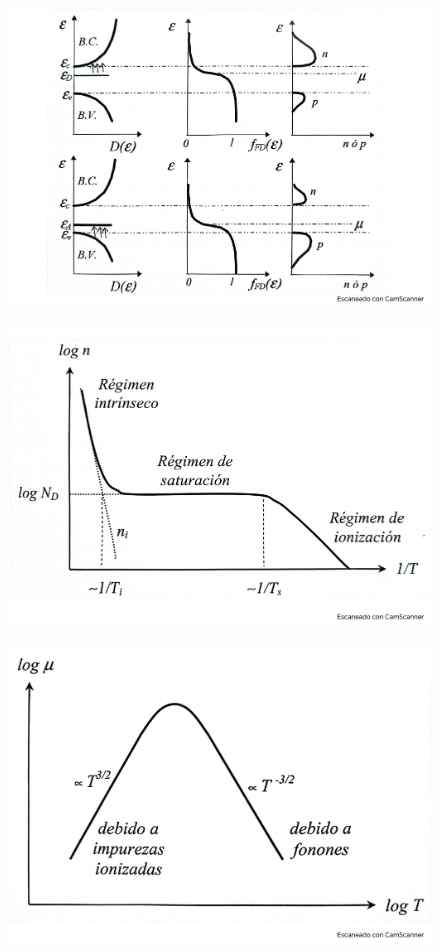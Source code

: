 \begin{figure}[h!] \centering
	\includegraphics[scale=0.5]{Cuerpo/Ch_09/Fotos libro 3.pdf}
	\caption{}
	\label{Fig:09-03}
\end{figure}
\begin{figure}[h!] \centering
	\includegraphics[scale=0.5]{Cuerpo/Ch_09/Fotos libro 4.pdf}
	\caption{}
	\label{Fig:09-04}
\end{figure}
\begin{figure}[h!] \centering
	\includegraphics[scale=0.5]{Cuerpo/Ch_09/Fotos libro 5.pdf}
	\caption{}
	\label{Fig:09-05}
\end{figure}
